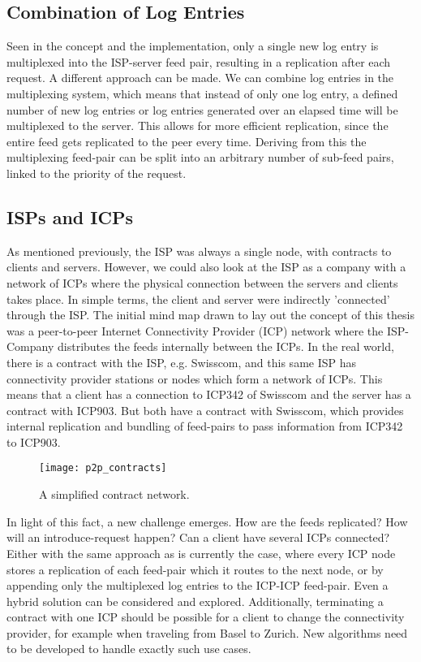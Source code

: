 \subsection{Combination of Log Entries}
Seen in the concept and the implementation, only a single new log entry is multiplexed into the ISP-server feed pair, resulting in a replication after each request. A different approach can be made. We can combine log entries in the multiplexing system, which means that instead of only one log entry, a defined number of new log entries or log entries generated over an elapsed time will be multiplexed to the server. This allows for more efficient replication, since the entire feed gets replicated to the peer every time. Deriving from this the multiplexing feed-pair can be split into an arbitrary number of sub-feed pairs, linked to the priority of the request.
\subsection{ISPs and ICPs}
As mentioned previously, the ISP was always a single node, with contracts to clients and servers. However, we could also look at the ISP as a company with a network of ICPs where the physical connection between the servers and clients takes place. In simple terms, the client and server were indirectly ’connected’ through the ISP. The initial mind map drawn to lay out the concept of this thesis was a peer-to-peer Internet Connectivity Provider (ICP) network where the ISP-Company distributes the feeds internally between the ICPs. In the real world, there is a contract with the ISP, e.g. Swisscom, and this same ISP has connectivity provider stations or nodes which form a network of ICPs. This means that a client has a connection to ICP342 of Swisscom and the server has a contract with ICP903. But both have a contract with Swisscom, which provides internal replication and bundling of feed-pairs to pass information from ICP342 to ICP903. 
\begin{figure}
    \centering
    \texttt{[image: p2p\_contracts]}
    \caption{A simplified contract network.}
    \label{fig:contract_network}
\end{figure}
In light of this fact, a new challenge emerges. How are the feeds replicated? How will an introduce-request happen? Can a client have several ICPs connected? Either with the same approach as is currently the case, where every ICP node stores a replication of each feed-pair which it routes to the next node, or by appending only the multiplexed log entries to the ICP-ICP feed-pair. Even a hybrid solution can be considered and explored. Additionally, terminating a contract with one ICP should be possible for a client to change the connectivity provider, for example when traveling from Basel to Zurich. New algorithms need to be developed to handle exactly such use cases.

